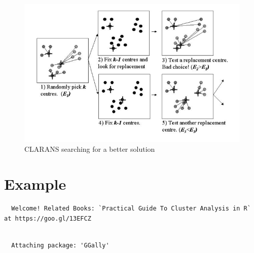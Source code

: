 \documentclass[12pt,twoside]{amherstthesis}
\begin{document}
  \begin{figure}[htbp]
  \centering
  \includegraphics[scale = 0.5,angle = 0]{clustering_pic.png}
  \caption[CLARANS searching for a better solution]{\normalsize{CLARANS searching for a better solution}}
  \label{fig:CLARANS}
  \end{figure}
  
  \chapter{Example}\label{typeset-equ}
  
  \begin{Shaded}
  \begin{Highlighting}[]
  \end{Highlighting}
  \end{Shaded}
  
  \begin{verbatim}
  Welcome! Related Books: `Practical Guide To Cluster Analysis in R` at https://goo.gl/13EFCZ
  \end{verbatim}
  
  \begin{Shaded}
  \begin{Highlighting}[]
  \end{Highlighting}
  \end{Shaded}
  
  \begin{verbatim}
  
  Attaching package: 'GGally'
  \end{verbatim}
  
\end{document}
